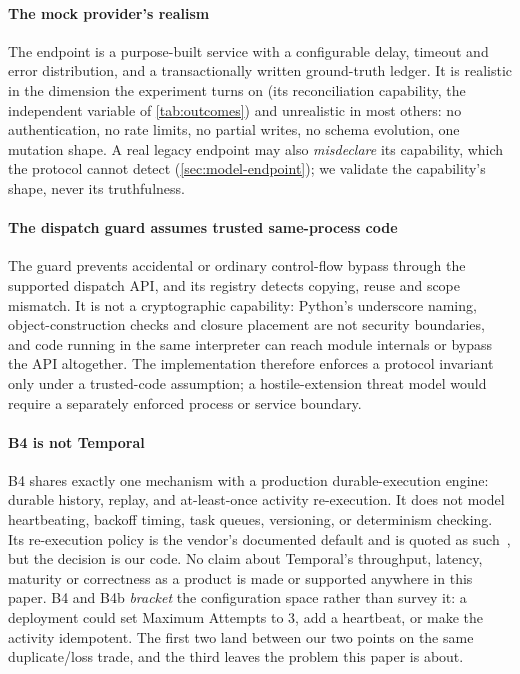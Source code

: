 \paragraph{The mock provider's realism} The endpoint is a purpose-built service
with a configurable delay, timeout and error distribution, and a
transactionally written ground-truth ledger. It is realistic in the dimension
the experiment turns on (its reconciliation capability, the independent
variable of \cref{tab:outcomes}) and unrealistic in most others: no
authentication, no rate limits, no partial writes, no schema evolution, one
mutation shape. A real legacy endpoint may also \emph{misdeclare} its
capability, which the protocol cannot detect (\cref{sec:model-endpoint}); we
validate the capability's shape, never its truthfulness.

\paragraph{The dispatch guard assumes trusted same-process code} The guard
prevents accidental or ordinary control-flow bypass through the supported
dispatch API, and its registry detects copying, reuse and scope mismatch. It is
not a cryptographic capability: Python's underscore naming,
object-construction checks and closure placement are not security boundaries,
and code running in the same interpreter can reach module internals or bypass
the API altogether. The implementation therefore enforces a protocol invariant
only under a trusted-code assumption; a hostile-extension threat model would
require a separately enforced process or service boundary.

\paragraph{B4 is not Temporal} B4 shares exactly one mechanism with a production
durable-execution engine: durable history, replay, and at-least-once activity
re-execution. It does not model heartbeating, backoff timing, task queues,
versioning, or determinism checking. Its re-execution policy is the vendor's
documented default and is quoted as such~\cite{temporal-retry}, but the decision
is our code. No claim about Temporal's throughput, latency, maturity or
correctness as a product is made or supported anywhere in this paper. B4 and B4b
\emph{bracket} the configuration space rather than survey it: a deployment could
set Maximum Attempts to 3, add a heartbeat, or make the activity idempotent.
The first two land between our two points on the same duplicate/loss trade, and
the third leaves the problem this paper is about.

